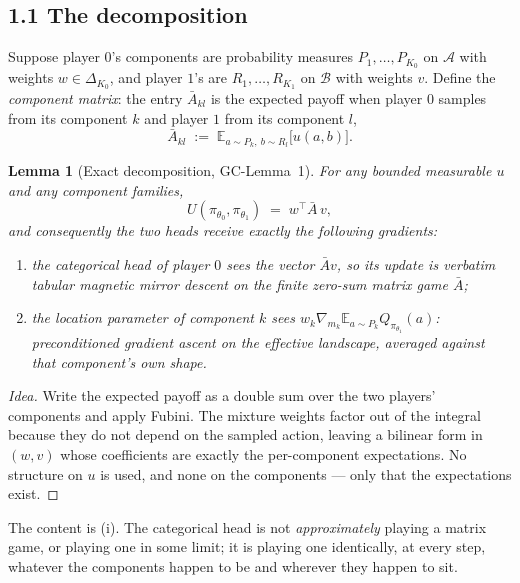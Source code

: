 \documentclass[11pt]{article}
\newtheorem{lemma}[theorem]{Lemma}
\theoremstyle{definition}
\newcommand{\E}{\mathbb{E}}
\newcommand{\cA}{\mathcal{A}}
\newcommand{\cB}{\mathcal{B}}
\newcommand{\GC}[1]{\textsf{GC-#1}}
\begin{document}
\subsection*{1.1 The decomposition}

Suppose player $0$'s components are probability measures $P_1,\dots,P_{K_0}$ on
$\cA$ with weights $w \in \Delta_{K_0}$, and player $1$'s are $R_1,\dots,R_{K_1}$
on $\cB$ with weights $v$. Define the \emph{component matrix}: the entry
$\bar A_{kl}$ is the expected payoff when player $0$ samples from its component
$k$ and player $1$ from its component $l$,
\begin{equation}\label{eq:Abar}
  \bar A_{kl} \;:=\; \E_{a \sim P_k,\ b \sim R_l}\big[u(a,b)\big].
\end{equation}

\begin{lemma}[Exact decomposition, \GC{Lemma~1}]\label{lem:decomp}
For any bounded measurable $u$ and any component families,
\[
  U(\pi_{\theta_0},\pi_{\theta_1}) \;=\; w^\top \bar A\, v ,
\]
and consequently the two heads receive exactly the following gradients:
\begin{enumerate}
\item[(i)] the categorical head of player $0$ sees the vector $\bar A v$, so its
  update is \emph{verbatim} tabular magnetic mirror descent on the finite
  zero-sum matrix game $\bar A$;
\item[(ii)] the location parameter of component $k$ sees $w_k \nabla_{m_k}
  \E_{a\sim P_k} Q_{\pi_{\theta_1}}(a)$: preconditioned gradient ascent on the
  effective landscape, averaged against that component's own shape.
\end{enumerate}
\end{lemma}

\begin{proof}[Idea]
Write the expected payoff as a double sum over the two players' components and
apply Fubini. The mixture weights factor out of the integral because they do not
depend on the sampled action, leaving a bilinear form in $(w,v)$ whose
coefficients are exactly the per-component expectations. No structure on $u$ is
used, and none on the components --- only that the expectations exist.
\end{proof}

The content is (i). The categorical head is not \emph{approximately} playing a
matrix game, or playing one in some limit; it is playing one identically, at
every step, whatever the components happen to be and wherever they happen to sit.
\end{document}
